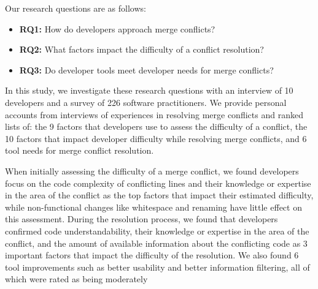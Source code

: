 Our research questions are as follows:
\begin{itemize}
\item\textbf{RQ1:} How do developers approach merge conflicts?\\
\item\textbf{RQ2:} What factors impact the difficulty of a conflict resolution?\\
\item\textbf{RQ3:} Do developer tools meet developer needs for merge conflicts?\\
\end{itemize}

In this study, we investigate these research questions with an interview of 10 developers and a survey of 226 software practitioners. We provide personal accounts from interviews of experiences in resolving merge conflicts and ranked lists of: the 9 factors that developers use to assess the difficulty of a conflict, the 10 factors that impact developer difficulty while resolving merge conflicts, and 6 tool needs for merge conflict resolution.

When initially assessing the difficulty of a merge conflict, we found developers focus on the code complexity of conflicting lines and their knowledge or expertise in the area of the conflict as the top factors that impact their estimated difficulty, while non-functional changes like whitespace and renaming have little effect on this assessment. 
During the resolution process, we found that developers confirmed code understandability, their knowledge or expertise in the area of the conflict, and the amount of available information about the conflicting code as 3 important factors that impact the difficulty of the resolution.
We also found 6 tool improvements such as better usability and better information filtering, all of which were rated as being moderately 
